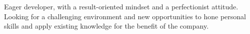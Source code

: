 %
%
%

{
    \fontsize{11}{11}\selectfont
    \par{
        Eager developer, with a result-oriented mindset and a perfectionist
        attitude. Looking for a challenging environment and new opportunities to
        hone personal skills and apply existing knowledge for the benefit of the
        company.
    }
}
\bigskip
